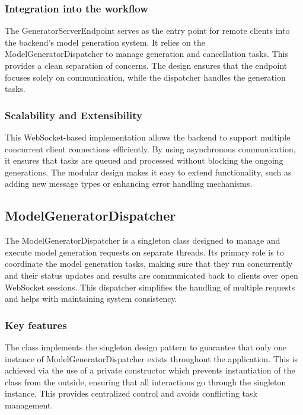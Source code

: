 			\subsubsection{Integration into the workflow} \label{Integration into the workflow}
				The GeneratorServerEndpoint serves as the entry point for remote clients into the backend's model generation system. 
				It relies on the ModelGeneratorDispatcher to manage generation and cancellation tasks. This provides a clean separation of concerns. 
				The design ensures that the endpoint focuses solely on communication, while the dispatcher handles the generation tasks.

			\subsubsection{Scalability and Extensibility} \label{Scalability and Extensibility}
				This WebSocket-based implementation allows the backend to support multiple concurrent client connections efficiently. 
				By using asynchronous communication, it ensures that tasks are queued and processed without blocking the ongoing generations. 
				The modular design makes it easy to extend functionality, such as adding new message types or enhancing error handling mechanisms.


		\subsection{ModelGeneratorDispatcher} \label{ModelGeneratorDispatcher}
			The ModelGeneratorDispatcher is a singleton class designed to manage and execute model generation requests on separate threads. 
			Its primary role is to coordinate the model generation tasks, making sure that they run concurrently and their status updates and results are 
			communicated back to clients over open WebSocket sessions. This dispatcher simplifies the handling of multiple requests 
			and helps with maintaining system consistency.

			\subsubsection{Key features} \label{Key features}
			The class implements the singleton design pattern to guarantee that only one instance of ModelGeneratorDispatcher exists throughout the application. 
			This is achieved via the use of a private constructor which prevents instantiation of the class from the outside, ensuring 
			that all interactions go through the singleton instance.
			This provides centralized control and avoids conflicting task management.


